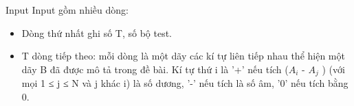 Input
Input gồm nhiều dòng:  
\begin{itemize}
	\item     Dòng thứ nhất ghi số T, số bộ test.   
	\item     T dòng tiếp theo: mỗi dòng là một dãy các kí tự liên tiếp nhau thể hiện một dãy B đã được mô tả trong đề bài. Kí tự thứ i là '+' nếu tích ($A_{i}$    - $A_{j}$    ) (với mọi 1 ≤ j ≤ N và j khác i) là số dương, '-' nếu tích là số âm, '0' nếu tích bằng 0.   
\end{itemize}
